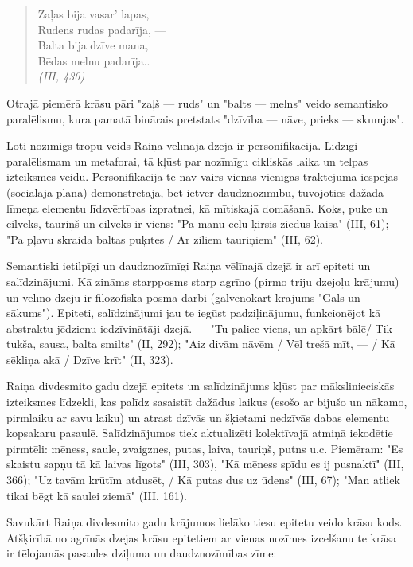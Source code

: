 \documentclass[11pt]{article}
\begin{document}
\begin{quote}
Zaļas bija vasar' lapas,\\
Rudens rudas padarīja, ---\\
Balta bija dzīve mana,\\
Bēdas melnu padarīja..\\
{\em (III, 430)}
\end{quote}

Otrajā piemērā krāsu pāri "zaļš --- ruds" un
"balts --- melns" veido semantisko paralēlismu,
kura pamatā binārais pretstats "dzīvība --- nāve,
prieks --- skumjas".

{\color{red}
Ļoti nozīmigs tropu veids Raiņa vēlīnajā dzejā ir
personifikācija. Līdzīgi paralēlismam un metaforai,
tā kļūst par nozīmīgu cikliskās laika un telpas
izteiksmes veidu. Personifikācija te nav vairs vienas
vienīgas traktējuma iespējas (sociālajā plānā)
demonstrētāja, bet ietver daudznozīmību, tuvojoties
dažāda līmeņa elementu līdzvērtības izpratnei,
kā mītiskajā domāšanā. Koks, puķe un cilvēks,
tauriņš un cilvēks ir viens: "Pa manu ceļu ķirsis
ziedus kaisa" (III, 61); "Pa pļavu skraida baltas
puķītes / Ar ziliem tauriņiem" (III, 62).
}

Semantiski ietilpīgi un daudznozīmīgi  Raiņa vēlīnajā
dzejā ir arī epiteti un salīdzinājumi. Kā zināms
starpposms starp agrīno (pirmo triju dzejoļu krājumu)
un vēlīno dzeju ir filozofiskā posma darbi (galvenokārt
krājums "Gals un sākums"). Epiteti, salīdzinājumi
jau te iegūst padziļinājumu, funkcionējot kā
abstraktu jēdzienu iedzīvinātāji dzejā. ---
"Tu paliec viens, un apkārt bālē/ Tik tukša, sausa,
balta smilts" (II, 292); "Aiz divām nāvēm /
Vēl trešā mīt, --- / Kā sēkliņa akā / Dzīve krīt"
(II, 323).

Raiņa divdesmito gadu dzejā epitets un salīdzinājums
kļūst par mākslinieciskās izteiksmes līdzekli, kas
palīdz sasaistīt dažādus laikus (esošo ar bijušo un
nākamo, pirmlaiku ar savu laiku) un atrast dzīvās un
šķietami nedzīvās dabas elementu kopsakaru pasaulē.
Salīdzinājumos tiek aktualizēti kolektīvajā atmiņā
iekodētie pirmtēli: mēness, saule, zvaigznes, putas,
laiva, tauriņš, putns u.c. Piemēram: "Es skaistu sapņu
tā kā laivas līgots" (III, 303), "Kā mēness spīdu es
ij pusnaktī" (III, 366); "Uz tavām krūtīm atdusēt, /
Kā putas dus uz ūdens" (III, 67); "Man atliek tikai bēgt
kā saulei ziemā" (III, 161).

Savukārt Raiņa divdesmito gadu krājumos lielāko tiesu
epitetu veido krāsu kods. Atšķirībā no agrīnās dzejas
krāsu epitetiem ar vienas nozīmes izcelšanu te krāsa
ir tēlojamās pasaules dziļuma un daudznozīmības zīme:
\end{document}
